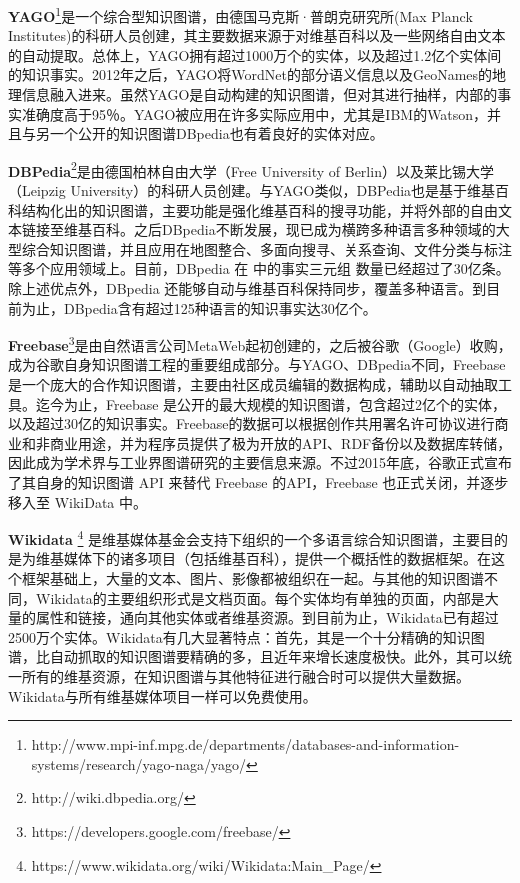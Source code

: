 	\textbf{YAGO}\footnote{http://www.mpi-inf.mpg.de/departments/databases-and-information-systems/research/yago-naga/yago/}是一个综合型知识图谱，由德国马克斯·普朗克研究所(Max Planck Institutes)的科研人员创建，其主要数据来源于对维基百科以及一些网络自由文本的自动提取。总体上，YAGO拥有超过1000万个的实体，以及超过1.2亿个实体间的知识事实。2012年之后，YAGO将WordNet的部分语义信息以及GeoNames的地理信息融入进来。虽然YAGO是自动构建的知识图谱，但对其进行抽样，内部的事实准确度高于95％。YAGO被应用在许多实际应用中，尤其是IBM的Watson，并且与另一个公开的知识图谱DBpedia也有着良好的实体对应。

	\textbf{DBPedia}\footnote{http://wiki.dbpedia.org/}是由德国柏林自由大学（Free University of Berlin）以及莱比锡大学（Leipzig University）的科研人员创建。与YAGO类似，DBPedia也是基于维基百科结构化出的知识图谱，主要功能是强化维基百科的搜寻功能，并将外部的自由文本链接至维基百科。之后DBpedia不断发展，现已成为横跨多种语言多种领域的大型综合知识图谱，并且应用在地图整合、多面向搜寻、关系查询、文件分类与标注等多个应用领域上。目前，DBpedia 在 中的事实三元组 数量已经超过了30亿条。除上述优点外，DBpedia 还能够自动与维基百科保持同步，覆盖多种语言。到目前为止，DBpedia含有超过125种语言的知识事实达30亿个。

	\textbf{Freebase}\footnote{https://developers.google.com/freebase/}是由自然语言公司MetaWeb起初创建的，之后被谷歌（Google）收购，成为谷歌自身知识图谱工程的重要组成部分。与YAGO、DBpedia不同，Freebase是一个庞大的合作知识图谱，主要由社区成员编辑的数据构成，辅助以自动抽取工具。迄今为止，Freebase 是公开的最大规模的知识图谱，包含超过2亿个的实体，以及超过30亿的知识事实。Freebase的数据可以根据创作共用署名许可协议进行商业和非商业用途，并为程序员提供了极为开放的API、RDF备份以及数据库转储，因此成为学术界与工业界图谱研究的主要信息来源。不过2015年底，谷歌正式宣布了其自身的知识图谱 API 来替代 Freebase 的API，Freebase 也正式关闭，并逐步移入至 WikiData 中。

	\textbf{Wikidata} \footnote{https://www.wikidata.org/wiki/Wikidata:Main\_Page/} 是维基媒体基金会支持下组织的一个多语言综合知识图谱，主要目的是为维基媒体下的诸多项目（包括维基百科），提供一个概括性的数据框架。在这个框架基础上，大量的文本、图片、影像都被组织在一起。与其他的知识图谱不同，Wikidata的主要组织形式是文档页面。每个实体均有单独的页面，内部是大量的属性和链接，通向其他实体或者维基资源。到目前为止，Wikidata已有超过2500万个实体。Wikidata有几大显著特点：首先，其是一个十分精确的知识图谱，比自动抓取的知识图谱要精确的多，且近年来增长速度极快。此外，其可以统一所有的维基资源，在知识图谱与其他特征进行融合时可以提供大量数据。Wikidata与所有维基媒体项目一样可以免费使用。 



